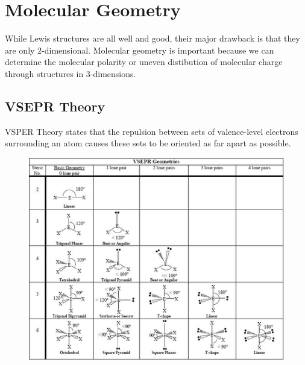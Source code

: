 \section{Molecular Geometry}
While Lewis structures are all well and good, their major drawback is that they
are only 2-dimensional.  Molecular geometry is important because we can
determine the molecular polarity or uneven distibution of molecular charge
through structures in 3-dimensions.

\subsection{VSEPR Theory}
VSPER Theory states that the repulsion between sets of valence-level electrons
surrounding an atom causes these sets to be oriented as far apart as possible.

\begin{figure}[H]
  \centering
  \includegraphics{res/vsepr_chart.png}
\end{figure}
